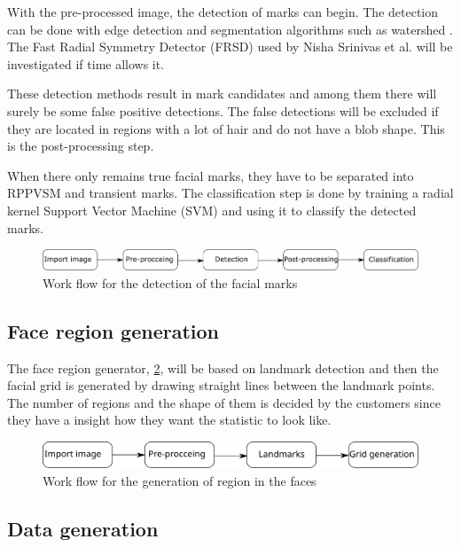 With the pre-processed image, the detection of marks can begin. The detection can be done with edge detection and segmentation algorithms such as watershed \cite{segmentation_method, edge_method}. The Fast Radial Symmetry Detector (FRSD) used by Nisha Srinivas et al. \cite{automatic_detector_2015} will be investigated if time allows it. 

These detection methods result in mark candidates and among them there will surely be some false positive detections. The false detections will be excluded if they are located in regions with a lot of hair and do not have a blob shape. This is the post-processing step. \cite{automatic_detector_2015}

When there only remains true facial marks, they have to be separated into RPPVSM and transient marks. The classification step is done by training a radial kernel Support Vector Machine (SVM) and using it to classify the detected marks.  

\begin{figure}[H]
\centering
\includegraphics[width=1.0\linewidth]{"../bilder/detection_flow"}
\caption{Work flow for the detection of the facial marks}
\label{fig:detection_flow}
\end{figure}

\subsection{Face region generation}

The face region generator, \cref{fig:grid_flow}, will be based on landmark detection and then the facial grid is generated by drawing straight lines between the landmark points. \cite{landmarks_SVM,landmarks_wild} The number of regions and the shape of them is decided by the customers since they have a insight how they want the statistic to look like. 

\begin{figure}[H]
	\centering
	\includegraphics[width=1.0\linewidth]{"../bilder/Grid_flow"}
	\caption{Work flow for the generation of region in the faces}
	\label{fig:grid_flow}
\end{figure}

\subsection{Data generation}

